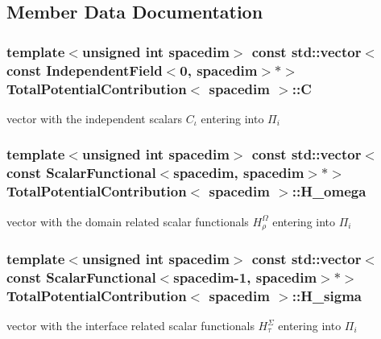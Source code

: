 \subsection{Member Data Documentation}
\subsubsection[{\texorpdfstring{C}{C}}]{\setlength{\rightskip}{0pt plus 5cm}template$<$unsigned int spacedim$>$ const std\+::vector$<$const {\bf Independent\+Field}$<$0, spacedim$>$$\ast$$>$ {\bf Total\+Potential\+Contribution}$<$ spacedim $>$\+::C}\hypertarget{class_total_potential_contribution_adea8f8f88243adec43df300e8c8d4593}{}\label{class_total_potential_contribution_adea8f8f88243adec43df300e8c8d4593}
vector with the independent scalars $C_\iota$ entering into $\Pi_i$ 
\subsubsection[{\texorpdfstring{H\+\_\+omega}{H_omega}}]{\setlength{\rightskip}{0pt plus 5cm}template$<$unsigned int spacedim$>$ const std\+::vector$<$const {\bf Scalar\+Functional}$<$spacedim, spacedim$>$$\ast$$>$ {\bf Total\+Potential\+Contribution}$<$ spacedim $>$\+::H\+\_\+omega}\hypertarget{class_total_potential_contribution_a15191539345978a3d0c7293bd7ecaa91}{}\label{class_total_potential_contribution_a15191539345978a3d0c7293bd7ecaa91}
vector with the domain related scalar functionals $H^\Omega_\rho$ entering into $\Pi_i$ 
\subsubsection[{\texorpdfstring{H\+\_\+sigma}{H_sigma}}]{\setlength{\rightskip}{0pt plus 5cm}template$<$unsigned int spacedim$>$ const std\+::vector$<$const {\bf Scalar\+Functional}$<$spacedim-\/1, spacedim$>$$\ast$$>$ {\bf Total\+Potential\+Contribution}$<$ spacedim $>$\+::H\+\_\+sigma}\hypertarget{class_total_potential_contribution_aac404e3a8493d9170541e34bd96673d3}{}\label{class_total_potential_contribution_aac404e3a8493d9170541e34bd96673d3}
vector with the interface related scalar functionals $H^\Sigma_\tau$ entering into $\Pi_i$ 
